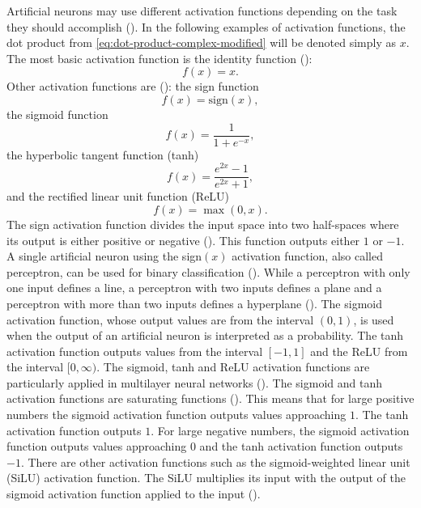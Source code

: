\documentclass{BachelorBUI}
\begin{document}
                Artificial neurons may use different activation functions depending on the task they should accomplish (\cite{Aggarwal:2018}). In the following examples of activation functions, the dot product from \autoref{eq:dot-product-complex-modified} will be denoted simply as $x$. The most basic activation function is the identity function (\cite{Aggarwal:2018}):
                \begin{equation}
                    f(x)=x.
                    \label{eq:identity-function}
                \end{equation}
                Other activation functions are (\cite{Aggarwal:2018}): the sign function
                \begin{equation}
                    f(x)=\text{sign}(x),
                    \label{eq:sign-function}
                \end{equation}
                the sigmoid function
                \begin{equation}
                    f(x) = \frac{1}{1 + e^{-x}},
                    \label{eq:sigmoid-function}
                \end{equation}
                the hyperbolic tangent function (tanh)
                \begin{equation}
                     f(x) = \frac{e^{2x}-1}{e^{2x}+1},
                    \label{eq:tanh-function}
                \end{equation}
                and the rectified linear unit function (ReLU)
                \begin{equation}
                    f(x) = \max(0, x).
                    \label{eq:relu-function}
                \end{equation}
                The sign activation function divides the input space into two half-spaces where its output is either positive or negative (\cite{Alpaydin:2014}). This function outputs either $1$ or $-1$. A single artificial neuron using the sign$(x)$ activation function, also called perceptron, can be used for binary classification (\cite{Aggarwal:2018}). While a perceptron with only one input defines a line, a perceptron with two inputs defines a plane and a perceptron with more than two inputs defines a hyperplane (\cite{Alpaydin:2014}). The sigmoid activation function, whose output values are from the interval $(0,1)$, is used when the output of an artificial neuron is interpreted as a probability. The tanh activation function outputs values from the interval $[-1,1]$ and the ReLU from the interval $[0, \infty)$. The sigmoid, tanh and ReLU activation functions are particularly applied in multilayer neural networks (\cite{Alpaydin:2014}). The sigmoid and tanh activation functions are saturating functions (\cite{Murphy:2022}). This means that for large positive numbers the sigmoid activation function outputs values approaching $1$. The tanh activation function outputs $1$. For large negative numbers, the sigmoid activation function outputs values approaching $0$ and the tanh activation function outputs $-1$. There are other activation functions such as the sigmoid-weighted linear unit (SiLU) activation function. The SiLU multiplies its input with the output of the sigmoid activation function applied to the input (\cite{Elfwing:2017}).
\end{document}
